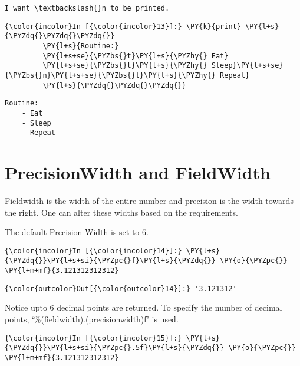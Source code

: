     \begin{Verbatim}[commandchars=\\\{\}]
I want \textbackslash{}n to be printed.
    \end{Verbatim}

    \begin{Verbatim}[commandchars=\\\{\}]
{\color{incolor}In [{\color{incolor}13}]:} \PY{k}{print} \PY{l+s}{\PYZdq{}\PYZdq{}\PYZdq{}}
         \PY{l+s}{Routine:}
         \PY{l+s+se}{\PYZbs{}t}\PY{l+s}{\PYZhy{} Eat}
         \PY{l+s+se}{\PYZbs{}t}\PY{l+s}{\PYZhy{} Sleep}\PY{l+s+se}{\PYZbs{}n}\PY{l+s+se}{\PYZbs{}t}\PY{l+s}{\PYZhy{} Repeat}
         \PY{l+s}{\PYZdq{}\PYZdq{}\PYZdq{}}
\end{Verbatim}

    \begin{Verbatim}[commandchars=\\\{\}]
Routine:
	- Eat
	- Sleep
	- Repeat
    \end{Verbatim}

    \section{PrecisionWidth and
FieldWidth}\label{precisionwidth-and-fieldwidth}

    Fieldwidth is the width of the entire number and precision is the width
towards the right. One can alter these widths based on the requirements.

The default Precision Width is set to 6.

    \begin{Verbatim}[commandchars=\\\{\}]
{\color{incolor}In [{\color{incolor}14}]:} \PY{l+s}{\PYZdq{}}\PY{l+s+si}{\PYZpc{}f}\PY{l+s}{\PYZdq{}} \PY{o}{\PYZpc{}} \PY{l+m+mf}{3.121312312312}
\end{Verbatim}

            \begin{Verbatim}[commandchars=\\\{\}]
{\color{outcolor}Out[{\color{outcolor}14}]:} '3.121312'
\end{Verbatim}
        
    Notice upto 6 decimal points are returned. To specify the number of
decimal points, `\%(fieldwidth).(precisionwidth)f' is used.

    \begin{Verbatim}[commandchars=\\\{\}]
{\color{incolor}In [{\color{incolor}15}]:} \PY{l+s}{\PYZdq{}}\PY{l+s+si}{\PYZpc{}.5f}\PY{l+s}{\PYZdq{}} \PY{o}{\PYZpc{}} \PY{l+m+mf}{3.121312312312}
\end{Verbatim}


